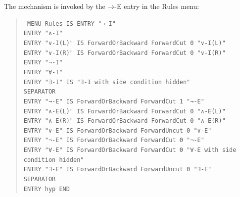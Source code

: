 The mechanism is invoked by the →-E entry in the Rules menu:
\begin{quote}\tt\small
MENU Rules IS
    ENTRY "→-I" \\
    ENTRY "∧-I"    \\
    ENTRY "∨-I(L)"  IS ForwardOrBackward ForwardCut 0 "∨-I(L)"\\
    ENTRY "∨-I(R)"  IS ForwardOrBackward ForwardCut 0 "∨-I(R)"\\
    ENTRY "¬-I"\\
    ENTRY "∀-I"\\
    ENTRY "∃-I"     IS "∃-I with side condition hidden"\\
    SEPARATOR\\
    ENTRY "→-E"     IS ForwardOrBackward ForwardCut 1 "→-E" \\
    ENTRY "∧-E(L)"  IS ForwardOrBackward ForwardCut 0 "∧-E(L)"\\
    ENTRY "∧-E(R)"  IS ForwardOrBackward ForwardCut 0 "∧-E(R)"\\
    ENTRY "∨-E"     IS ForwardOrBackward ForwardUncut 0 "∨-E"  \\ 
    ENTRY "¬-E"     IS ForwardOrBackward ForwardCut 0 "¬-E" \\
    ENTRY "∀-E"     IS ForwardOrBackward ForwardCut 0 "∀-E with side condition hidden"\\  
    ENTRY "∃-E"     IS ForwardOrBackward ForwardUncut 0 "∃-E"\\
    SEPARATOR\\
    ENTRY hyp
END
\end{quote}

